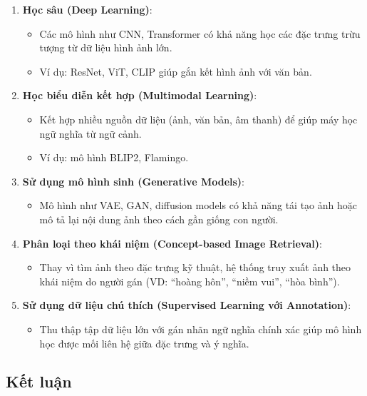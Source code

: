 \documentclass[12pt]{article}
\begin{document}
	\begin{enumerate}[label=\textbf{\arabic*.}]
	\item \textbf{Học sâu (Deep Learning)}:
	\begin{itemize}
	\item Các mô hình như CNN, Transformer có khả năng học các đặc trưng trừu tượng từ dữ liệu hình ảnh lớn.
	\item Ví dụ: ResNet, ViT, CLIP giúp gắn kết hình ảnh với văn bản.
	\end{itemize}
	
	\item \textbf{Học biểu diễn kết hợp (Multimodal Learning)}:
	\begin{itemize}
	\item Kết hợp nhiều nguồn dữ liệu (ảnh, văn bản, âm thanh) để giúp máy học ngữ nghĩa từ ngữ cảnh.
	\item Ví dụ: mô hình BLIP2, Flamingo.
	\end{itemize}
	
	\item \textbf{Sử dụng mô hình sinh (Generative Models)}:
	\begin{itemize}
	\item Mô hình như VAE, GAN, diffusion models có khả năng tái tạo ảnh hoặc mô tả lại nội dung ảnh theo cách gần giống con người.
	\end{itemize}
	
	\item \textbf{Phân loại theo khái niệm (Concept-based Image Retrieval)}:
	\begin{itemize}
	\item Thay vì tìm ảnh theo đặc trưng kỹ thuật, hệ thống truy xuất ảnh theo khái niệm do người gán (VD: ``hoàng hôn'', ``niềm vui'', ``hòa bình'').
	\end{itemize}
	
	\item \textbf{Sử dụng dữ liệu chú thích (Supervised Learning với Annotation)}:
	\begin{itemize}
	\item Thu thập tập dữ liệu lớn với gán nhãn ngữ nghĩa chính xác giúp mô hình học được mối liên hệ giữa đặc trưng và ý nghĩa.
	\end{itemize}
	\end{enumerate}
	
	\subsection{Kết luận}
	
\end{document}
